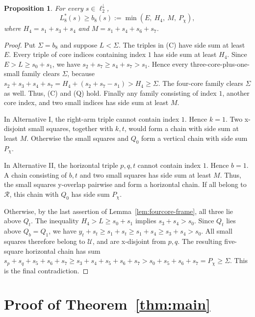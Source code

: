 \documentclass[12pt]{amsart}
\newtheorem{proposition}[theorem]{Proposition}
\theoremstyle{definition}
\theoremstyle{remark}
\numberwithin{equation}{section}
\numberwithin{figure}{section}
\numberwithin{table}{section}
\newcommand{\Pchi}{P_\chi}
\begin{document}
\begin{proposition}\label{prop:ell9}
For every $s\in\ell_2^\downarrow$,
\[
L_8^*(s)\ge b_8(s):=\min(E,\ H_4,\ M,\ \Pchi),
\]
where $H_4=s_1+s_3+s_4$ and $M=s_1+s_4+s_6+s_7$.
\end{proposition}
\begin{proof}
Put \(\Sigma=b_8\) and suppose \(L<\Sigma\).
The triples in (C) have side sum at least \(E\). Every triple of core
indices containing index \(1\) has side sum at least \(H_4\). Since
\(E>L\ge s_0+s_1\), we have \(s_2+s_7\ge s_4+s_7>s_1\). Hence every
three-core-plus-one-small family clears $\Sigma$, because
\(s_2+s_3+s_4+s_7=H_4+(s_2+s_7-s_1)>H_4\ge\Sigma\).
The four-core family clears $\Sigma$ as well. Thus, (C) and (Q) hold.
Finally any family consisting of index \(1\), another core index, and two
small indices has side sum at least \(M\).

In Alternative I, the right-arm triple cannot contain index \(1\). Hence
\(k=1\). Two x-disjoint small squares, together with \(k,t\), would form a chain
with side sum at least \(M\). Otherwise the small squares and \(Q_0\) form a
vertical chain with side sum \(\Pchi\).

In Alternative II, the horizontal triple \(p,q,t\) cannot contain
index \(1\). Hence \(b=1\). A chain consisting of \(b,t\) and two small
squares has side sum at least \(M\). Thus, the small squares y-overlap pairwise
and form a horizontal chain. If all belong to \(\mathcal R\), this chain with
\(Q_0\) has side sum \(\Pchi\).

Otherwise, by the last assertion of Lemma~\ref{lem:fourcore-frame}, all three
lie above \(Q_t\). The inequality \(H_4>L\ge s_0+s_1\) implies
\(s_3+s_4>s_0\). Since \(Q_t\) lies above \(Q_b=Q_1\), we have
\(y_t+s_t\ge s_1+s_t\ge s_1+s_4\ge s_3+s_4>s_0\).
All small squares therefore belong to \(\mathcal U\), and are x-disjoint
from \(p,q\). The resulting five-square horizontal chain has sum
$s_p+s_q+s_5+s_6+s_7\ge s_3+s_4+s_5+s_6+s_7>s_0+s_5+s_6+s_7=\Pchi\ge\Sigma$.
This is the final contradiction.
\end{proof}

\section{Proof of \texorpdfstring{Theorem~\ref{thm:main}}{Theorem 1.1}}\label{sec:proof}
\end{document}
